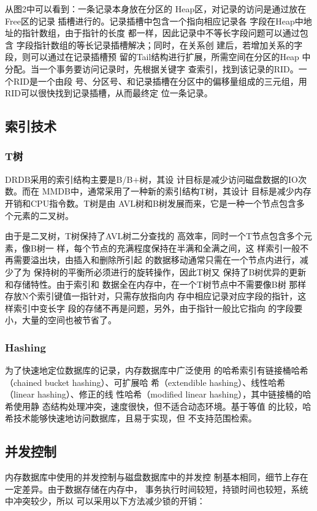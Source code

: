 \documentclass[literaturereview]{zjutreport}
\begin{document}
从图2中可以看到：一条记录本身放在分区的
Heap区，对记录的访问是通过放在Free区的记录
插槽进行的。记录插槽中包含一个指向相应记录各
字段在Heap中地址的指针数组，由于指针的长度
都一样，因此记录中不等长字段问题可以通过包含
字段指针数组的等长记录插槽解决；同时，在关系创
建后，若增加关系的字段，则可以通过在记录插槽预
留的Tail结构进行扩展，所需空间在分区的Heap
中分配。当一个事务要访问记录时，先根据关键字
查索引，找到该记录的RID。一个RID是一个由段
号、分区号、和记录插槽在分区中的偏移量组成的三元组，用RID可以很快找到记录插槽，从而最终定
位一条记录。

\subsection{索引技术}
\subsubsection{T树}
DRDB采用的索引结构主要是B/B$+$树，其设
计目标是减少访问磁盘数据的IO次数。而在
MMDB中，通常采用了一种新的索引结构T树，其设计
目标是减少内存开销和CPU指令数。T树是由
AVL树和B树发展而来，它是一种一个节点包含多
个元素的二叉树。


由于是二叉树，T树保持了AVL树二分查找的
高效率，同时一个T节点包含多个元素，像B树一
样，每个节点的充满程度保持在半满和全满之间，这
样索引一般不再需要溢出块，由插入和删除所引起
的数据移动通常只需在一个节点内进行，减少了为
保持树的平衡所必须进行的旋转操作，因此T树又
保持了B树优异的更新和存储特性。由于索引和
数据全在内存中，在一个T树节点中不需要像B树
那样存放N个索引键值一指针对，只需存放指向内
存中相应记录对应字段的指针，这样索引中变长字
段的存储不再是问题，另外，由于指针一般比它指向
的字段要小，大量的空间也被节省了。

\subsubsection{Hashing}
为了快速地定位数据库的记录，内存数据库中广泛使用
的哈希索引有链接桶哈希（chained bucket hashing）、可扩展哈
希（extendible hashing）、线性哈希（linear hashing）、修正的线
性哈希（modified linear hashing），其中链接桶的哈希使用静
态结构处理冲突，速度很快，但不适合动态环境。基于等值
的比较，哈希技术能够快速地访问数据库，且易于实现，但
不支持范围检索。

\subsection{并发控制}
内存数据库中使用的并发控制与磁盘数据库中的并发控
制基本相同，细节上存在一定差异。由于数据存储在内存中，
事务执行时间较短，持锁时间也较短，系统中冲突较少，所以
可以采用以下方法减少锁的开销：
\end{document}
